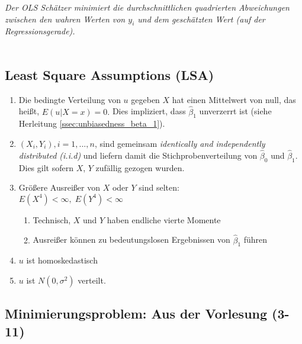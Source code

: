 
{\itshape Der OLS Schätzer minimiert die durchschnittlichen quadrierten Abweichungen zwischen den wahren Werten von $y_i$ und dem geschätzten Wert (auf der Regressionsgerade).}\\\\
\subsection{Least Square Assumptions (LSA)}
\label{subsect:lsa}

\begin{enumerate}
	\item Die bedingte Verteilung von $u$ gegeben $X$ hat einen Mittelwert von null,
		das heißt, $E (u|X = x) = 0.$
		Dies impliziert, dass $\hat\beta_1$ unverzerrt ist (siehe Herleitung
		\ref{ssec:unbiasedness_beta_1}).
	\item $(X_i, Y_i ), i = 1,..., n$, sind gemeinsam \emph {identically and
		independently distributed (i.i.d)} und liefern
		damit die Stichprobenverteilung von $\hat\beta_0$ und $\hat\beta_1$.
		Dies gilt sofern $X$, $Y$ zufällig gezogen wurden.
	\item Größere Ausreißer von $X$ oder $Y$ sind selten:\\
		$E(X^4)<\infty,\;E(Y^4)<\infty$
		\begin{enumerate}
			\item 		 Technisch, $X$ und $Y$ haben endliche vierte Momente
			\item		 Ausreißer können zu bedeutungslosen Ergebnissen von $\hat\beta_1$ führen
		\end{enumerate}
	\item $u$ ist homoskedastisch%
	\item $u$ ist $N(0, \sigma^2 )$ verteilt.
\end{enumerate}


\subsection{Minimierungsproblem: Aus der Vorlesung (3-11)}
\label{subsect:aus_der_vorlesung}

